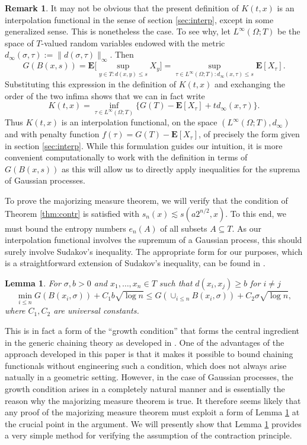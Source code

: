 \documentclass[10pt,reqno]{amsart}
\newtheorem{lem}[thm]{Lemma}
\theoremstyle{definition}
\newtheorem{rem}[thm]{Remark}
\numberwithin{equation}{section}
\numberwithin{figure}{section}
\numberwithin{table}{section}
\newcommand{\E}{\mathbf{E}}
\begin{document}
\begin{rem}
It may not be obvious that the present definition of $K(t,x)$ is
an interpolation functional in the sense of section \ref{sec:interp}, 
except in some generalized sense. This is nonetheless the case.
To see why, let $L^\infty(\Omega;T)$ be the space of $T$-valued random
variables endowed with the metric 
$d_\infty(\sigma,\tau):=\|d(\sigma,\tau)\|_\infty$. Then
$$
	G(B(x,s)) = \E\bigg[\sup_{y\in T:d(x,y)\le s}X_y\bigg] =
	\sup_{\tau\in L^\infty(\Omega;T):d_\infty(x,\tau)\le s}
	\E[X_\tau].
$$
Substituting this expression in the definition of $K(t,x)$ and exchanging 
the order of the two infima shows that we can in fact write
$$
	K(t,x) = \inf_{\tau\in L^\infty(\Omega;T)}
	\{G(T) - \E[X_\tau] + td_\infty(x,\tau)\}.
$$
Thus $K(t,x)$ is an interpolation functional, on the space
$(L^\infty(\Omega;T),d_\infty)$ and with penalty function $f(\tau)=G(T) - 
\E[X_\tau]$, of precisely the form given in section \ref{sec:interp}.
While this formulation guides our intuition, it is more convenient 
computationally to work with the definition in terms of $G(B(x,s))$ as 
this will allow us to directly apply inequalities for the suprema of 
Gaussian processes.
\end{rem}

To prove the majorizing measure theorem, we will verify that the condition 
of Theorem \ref{thm:contr} is satisfied with $s_n(x)\lesssim s(a2^{n/2},x)$.
To this end, we must bound the entropy numbers $e_n(A)$ of all subsets
$A\subseteq T$. As our interpolation functional involves the supremum of a 
Gaussian process, this should surely involve Sudakov's inequality. The 
appropriate form for our purposes, which is a straightforward extension of 
Sudakov's inequality, can be found in \cite[Proposition 2.4.9]{Tal14}.

\begin{lem}
\label{lem:supersud}
For $\sigma,b>0$ and $x_1,\ldots,x_n\in T$ such that
$d(x_i,x_j)\ge b$ for $i\ne j$
$$
	\min_{i\le n}G(B(x_i,\sigma)) +
	C_1b\sqrt{\log n} \le
	G(\cup_{i\le n}B(x_i,\sigma)) + C_2\sigma\sqrt{\log n},
$$
where $C_1,C_2$ are universal constants.
\end{lem}

This is in fact a form of the ``growth condition'' that forms the central 
ingredient in the generic chaining theory as developed in \cite{Tal14}. 
One of the advantages of the approach developed in this paper is that it 
makes it possible to bound chaining functionals without engineering such a 
condition, which does not always arise natually in a geometric setting. 
However, in the case of Gaussian processes, the growth condition arises in 
a completely natural manner and is essentially the reason why the 
majorizing measure theorem is true. It therefore seems likely that any 
proof of the majorizing measure theorem must exploit a form of Lemma 
\ref{lem:supersud} at the crucial point in the argument. We will presently 
show that Lemma \ref{lem:supersud} provides a very simple method for 
verifying the assumption of the contraction principle.
\end{document}
